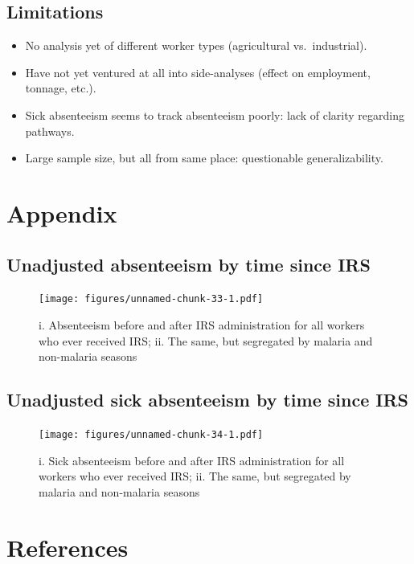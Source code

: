 \documentclass[]{article}
\providecommand{\tightlist}{%
  \setlength{\itemsep}{0pt}\setlength{\parskip}{0pt}}
\begin{document}
\subsection{Limitations}\label{limitations}

\begin{itemize}
\tightlist
\item
  No analysis yet of different worker types (agricultural
  vs.~industrial).
\item
  Have not yet ventured at all into side-analyses (effect on employment,
  tonnage, etc.).
\item
  Sick absenteeism seems to track absenteeism poorly: lack of clarity
  regarding pathways.
\item
  Large sample size, but all from same place: questionable
  generalizability.
\end{itemize}

\newpage

\section{Appendix}\label{appendix}

\subsection{Unadjusted absenteeism by time since
IRS}\label{unadjusted-absenteeism-by-time-since-irs}

\begin{figure}
\centering
\texttt{[image: figures/unnamed-chunk-33-1.pdf]}
\caption{i. Absenteeism before and after IRS administration for all
workers who ever received IRS; ii. The same, but segregated by malaria
and non-malaria seasons}
\end{figure}

\subsection{Unadjusted sick absenteeism by time since
IRS}\label{unadjusted-sick-absenteeism-by-time-since-irs}

\begin{figure}
\centering
\texttt{[image: figures/unnamed-chunk-34-1.pdf]}
\caption{i. Sick absenteeism before and after IRS administration for all
workers who ever received IRS; ii. The same, but segregated by malaria
and non-malaria seasons}
\end{figure}

\section*{References}\label{references}
\end{document}
